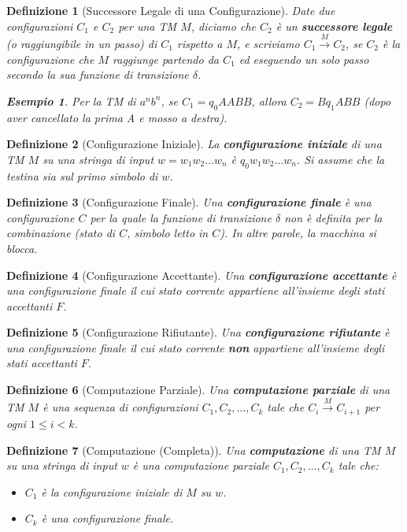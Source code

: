 \documentclass[a4paper]{article}
\newtheorem{definition}{Definizione}
\newtheorem{example}{Esempio}
\begin{document}
\begin{definition}[Successore Legale di una Configurazione]
    Date due configurazioni $C_1$ e $C_2$ per una TM $M$, diciamo che $C_2$ è un \textbf{successore legale} (o raggiungibile in un passo) di $C_1$ rispetto a $M$, e scriviamo $C_1 \xrightarrow{M} C_2$, se $C_2$ è la configurazione che $M$ raggiunge partendo da $C_1$ ed eseguendo un solo passo secondo la sua funzione di transizione $\delta$.
    \begin{example}
        Per la TM di $a^n b^n$, se $C_1 = q_0 AABB$, allora $C_2 = B q_1 ABB$ (dopo aver cancellato la prima A e mosso a destra).
    \end{example}
\end{definition}

\begin{definition}[Configurazione Iniziale]
    La \textbf{configurazione iniziale} di una TM $M$ su una stringa di input $w = w_1 w_2 \dots w_n$ è $q_0 w_1 w_2 \dots w_n$. Si assume che la testina sia sul primo simbolo di $w$.
\end{definition}

\begin{definition}[Configurazione Finale]
    Una \textbf{configurazione finale} è una configurazione $C$ per la quale la funzione di transizione $\delta$ non è definita per la combinazione (stato di $C$, simbolo letto in $C$). In altre parole, la macchina si blocca.
\end{definition}

\begin{definition}[Configurazione Accettante]
    Una \textbf{configurazione accettante} è una configurazione finale il cui stato corrente appartiene all'insieme degli stati accettanti $F$.
\end{definition}

\begin{definition}[Configurazione Rifiutante]
    Una \textbf{configurazione rifiutante} è una configurazione finale il cui stato corrente \textbf{non} appartiene all'insieme degli stati accettanti $F$.
\end{definition}

\begin{definition}[Computazione Parziale]
    Una \textbf{computazione parziale} di una TM $M$ è una sequenza di configurazioni $C_1, C_2, \dots, C_k$ tale che $C_i \xrightarrow{M} C_{i+1}$ per ogni $1 \le i < k$.
\end{definition}

\begin{definition}[Computazione (Completa)]
    Una \textbf{computazione} di una TM $M$ su una stringa di input $w$ è una computazione parziale $C_1, C_2, \dots, C_k$ tale che:
    \begin{itemize}
        \item $C_1$ è la configurazione iniziale di $M$ su $w$.
        \item $C_k$ è una configurazione finale.
    \end{itemize}
\end{definition}
\end{document}
